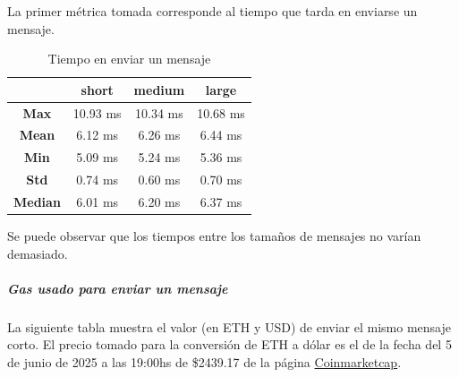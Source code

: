La primer métrica tomada corresponde al tiempo que tarda en enviarse un mensaje.

\setlength\tabcolsep{10pt}
\begin{table}[!htbp]
    \centering
    \begin{tabular}{|*4{c|}}
    \hline
    & \textbf{short} & \textbf{medium} & \textbf{large} \\
    \hline
    \textbf{Max} & 10.93 ms & 10.34 ms & 10.68 ms \\
    \hline
    \textbf{Mean} & 6.12 ms & 6.26 ms & 6.44 ms \\
    \hline
    \textbf{Min} & 5.09 ms & 5.24 ms & 5.36 ms \\
    \hline
    \textbf{Std} & 0.74 ms & 0.60 ms & 0.70 ms \\
    \hline
    \textbf{Median} & 6.01 ms & 6.20 ms & 6.37 ms\\
    \hline
    \end{tabular}
    \caption{Tiempo en enviar un mensaje}
\end{table}

Se puede observar que los tiempos entre los tamaños de mensajes no varían demasiado.

\subparagraph{Gas usado para enviar un mensaje}

La siguiente tabla muestra el valor (en ETH y USD) de enviar el mismo mensaje corto. El precio tomado para la conversión de ETH a dólar es el de la fecha del 5 de junio de 2025 a las 19:00hs de \$2439.17 de la página \href{https://coinmarketcap.com/currencies/ethereum/}{Coinmarketcap}.

